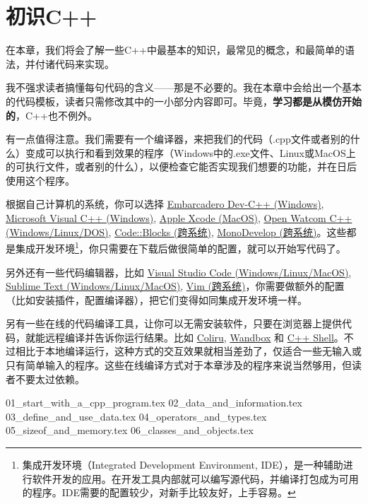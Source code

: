 \chapter{初识C++}
在本章，我们将会了解一些C++中最基本的知识，最常见的概念，和最简单的语法，并付诸代码来实现。\par
我不强求读者搞懂每句代码的含义——那是不必要的。我在本章中会给出一个基本的代码模板，读者只需修改其中的一小部分内容即可。毕竟，\textbf{学习都是从模仿开始的}，C++也不例外。\par
有一点值得注意。我们需要有一个编译器，来把我们的代码（.cpp文件或者别的什么）变成可以执行和看到效果的程序（Windows中的.exe文件、Linux或MacOS上的可执行文件，或者别的什么），以便检查它能否实现我们想要的功能，并在日后使用这个程序。\par
根据自己计算机的系统，你可以选择 \href{https://www.embarcadero.com/free-tools/dev-cpp}{Embarcadero Dev-C++ (Windows)}, \href{https://learn.microsoft.com/zh-cn/cpp/?view=msvc-170}{Microsoft Visual C++ (Windows)}, \href{https://developer.apple.com/xcode/}{Apple Xcode (MacOS)}, \href{https://github.com/open-watcom/open-watcom-v2}{Open Watcom C++ (Windows/Linux/DOS)}, \href{https://www.codeblocks.org/}{Code::Blocks (跨系统)}, \href{https://www.monodevelop.com/}{MonoDevelop (跨系统)}。这些都是集成开发环境\footnote{集成开发环境（Integrated Development Environment, IDE），是一种辅助进行软件开发的应用。在开发工具内部就可以编写源代码，并编译打包成为可用的程序。IDE需要的配置较少，对新手比较友好，上手容易。}，你只需要在下载后做很简单的配置，就可以开始写代码了。\par
另外还有一些代码编辑器，比如 \href{https://code.visualstudio.com/}{Visual Studio Code (Windows/Linux/MacOS)}, \href{https://www.sublimetext.com/}{Sublime Text (Windows/Linux/MacOS)}, \href{https://www.vim.org/}{Vim (跨系统)}，你需要做额外的配置（比如安装插件，配置编译器），把它们变得如同集成开发环境一样。\par
另有一些在线的代码编译工具，让你可以无需安装软件，只要在浏览器上提供代码，就能远程编译并告诉你运行结果。比如 \href{https://coliru.stacked-crooked.com/}{Coliru}, \href{https://wandbox.org/}{Wandbox} 和 \href{https://cpp.sh/}{C++ Shell}。不过相比于本地编译运行，这种方式的交互效果就相当差劲了，仅适合一些无输入或只有简单输入的程序。这些在线编译方式对于本章涉及的程序来说当然够用，但读者不要太过依赖。\par
{01_start_with_a_cpp_program.tex}
{02_data_and_information.tex}
{03_define_and_use_data.tex}
{04_operators_and_types.tex}
{05_sizeof_and_memory.tex}
{06_classes_and_objects.tex}
